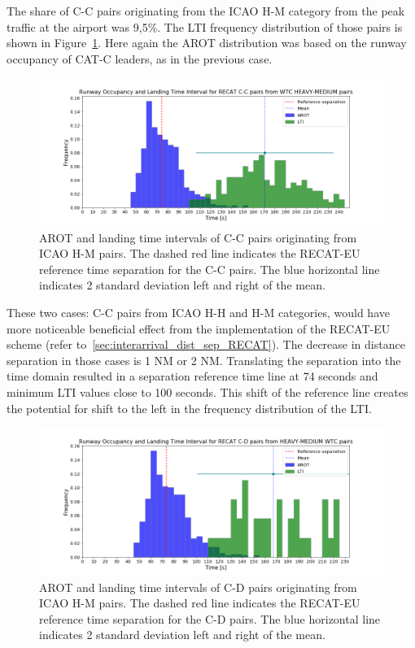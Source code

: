 The share of C-C pairs originating from the ICAO H-M category from the peak traffic at the airport was 9,5\%.  The LTI frequency distribution of those pairs is shown in Figure~\ref{fig:CC_from_HM_pairs_time_sep}. Here again the AROT distribution was based on the runway occupancy of CAT-C leaders, as in the previous case. 
 
\begin{figure}[h]
    \centering
    \includegraphics[width=1\textwidth]{graphics/fig_CC_from_HM_pairs_time_sep.png}
    \caption[AROT and LTI of C-C pairs originating from ICAO H-M pairs]{AROT and landing time intervals of C-C pairs originating from ICAO H-M pairs. The dashed red line indicates the RECAT-EU reference time separation for the C-C pairs. The blue horizontal line indicates 2 standard deviation left and right of the mean.}
    \label{fig:CC_from_HM_pairs_time_sep}
\end{figure}

These two cases: C-C pairs from ICAO H-H and H-M categories, would have more noticeable beneficial effect from the implementation of the RECAT-EU scheme (refer to~\ref{sec:interarrival_dist_sep_RECAT}). The decrease in distance separation in those cases is 1 NM or 2 NM. Translating the separation into the time domain resulted in a separation reference time line at 74 seconds and minimum LTI values close to 100 seconds. This shift of the reference line creates the potential for shift to the left in the frequency distribution of the LTI.
 
 \begin{figure}[h]
    \centering
    \includegraphics[width=1\textwidth]{graphics/fig_CD_from_HM_pairs_time_sep.png}
    \caption[AROT and LTI of C-D pairs originating from ICAO H-M pairs]{AROT and landing time intervals of C-D pairs originating from ICAO H-M pairs. The dashed red line indicates the RECAT-EU reference time separation for the C-D pairs. The blue horizontal line indicates 2 standard deviation left and right of the mean.}
    \label{fig:CD_from_HM_pairs_time_sep}
\end{figure}

